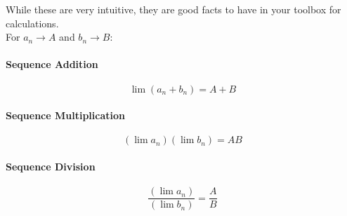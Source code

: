 \documentclass[../revisedmain.tex]{subfiles}
\begin{document}
	While these are very intuitive, they are good facts to have in your toolbox for calculations.\\\newline 
	For $a_n\to A$ and $b_n\to B$:
	\paragraph{Sequence Addition} \[\lim(a_n+b_n) = A + B\]
	\paragraph{Sequence Multiplication} \[\left(\lim a_n \right)\left(\lim b_n \right)=AB \]
	\paragraph{Sequence Division} \[\frac{\left(\lim a_n\right)}{\left(\lim b_n\right)} = \frac{A}{B} \]
\end{document}
